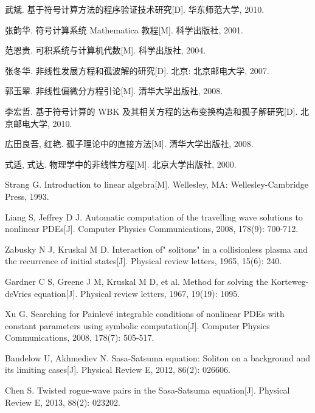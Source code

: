\cleardoublepage
{}
{}
\nocite{*}
%

\begin{thebibliography}{0}

武斌. 基于符号计算方法的程序验证技术研究[D]. 华东师范大学, 2010.

张韵华. 符号计算系统 Mathematica 教程[M]. 科学出版社, 2001.

范恩贵. 可积系统与计算机代数[M]. 科学出版社, 2004.

张冬华. 非线性发展方程和孤波解的研究[D]. 北京: 北京邮电大学, 2007.

郭玉翠. 非线性偏微分方程引论[M]. 清华大学出版社, 2008.

李宏哲. 基于符号计算的 WBK 及其相关方程的达布变换构造和孤子解研究[D]. 北京邮电大学, 2010.

広田良吾, 红艳. 孤子理论中的直接方法[M]. 清华大学出版社, 2008.

式适, 式达. 物理学中的非线性方程[M]. 北京大学出版社, 2000.






Strang G. Introduction to linear algebra[M]. Wellesley, MA: Wellesley-Cambridge Press, 1993.

Liang S, Jeffrey D J. Automatic computation of the travelling wave solutions to nonlinear PDEs[J]. Computer Physics Communications, 2008, 178(9): 700-712.

Zabusky N J, Kruskal M D. Interaction of" solitons" in a collisionless plasma and the recurrence of initial states[J]. Physical review letters, 1965, 15(6): 240.

Gardner C S, Greene J M, Kruskal M D, et al. Method for solving the Korteweg-deVries equation[J]. Physical review letters, 1967, 19(19): 1095.

Xu G. Searching for Painlevé integrable conditions of nonlinear PDEs with constant parameters using symbolic computation[J]. Computer Physics Communications, 2008, 178(7): 505-517.



Bandelow U, Akhmediev N. Sasa-Satsuma equation: Soliton on a background and its limiting cases[J]. Physical Review E, 2012, 86(2): 026606.

Chen S. Twisted rogue-wave pairs in the Sasa-Satsuma equation[J]. Physical Review E, 2013, 88(2): 023202.


\end{thebibliography}
